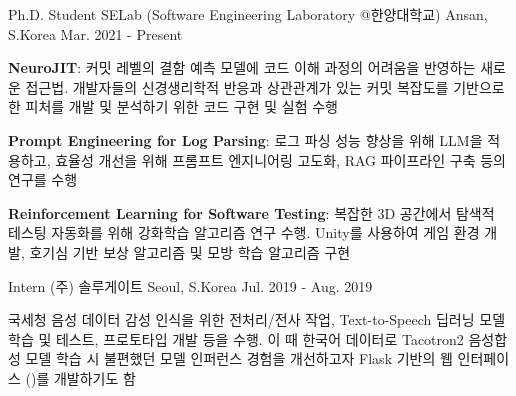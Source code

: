 

\begin{cventries}

  \cventry
    {Ph.D. Student} %
    {SELab (Software Engineering Laboratory @한양대학교)} %
    {Ansan, S.Korea} %
    {Mar. 2021 - Present} %
    {
      \begin{cvitems} %
        \item \textbf{NeuroJIT}: 커밋 레벨의 결함 예측 모델에 코드 이해 과정의 어려움을 반영하는 새로운 접근법. 개발자들의 신경생리학적 반응과 상관관계가 있는 커밋 복잡도를 기반으로 한 피처를 개발 및 분석하기 위한 코드 구현 및 실험 수행
        \item \textbf{Prompt Engineering for Log Parsing}: 로그 파싱 성능 향상을 위해 LLM을 적용하고, 효율성 개선을 위해 프롬프트 엔지니어링 고도화, RAG 파이프라인 구축 등의 연구를 수행
        \item \textbf{Reinforcement Learning for Software Testing}: 복잡한 3D 공간에서 탐색적 테스팅 자동화를 위해 강화학습 알고리즘 연구 수행. Unity를 사용하여 게임 환경 개발, 호기심 기반 보상 알고리즘 및 모방 학습 알고리즘 구현
      \end{cvitems}
    }


\cventry
{Intern} %
{(주) 솔루게이트} %
{Seoul, S.Korea} %
{Jul. 2019 - Aug. 2019} %
{
  \begin{cvitems} %
    \item {국세청 음성 데이터 감성 인식을 위한 전처리/전사 작업, Text-to-Speech 딥러닝 모델 학습 및 테스트, 프로토타입 개발 등을 수행. 이 때 한국어 데이터로 Tacotron2 음성합성 모델 학습 시 불편했던 모델 인퍼런스 경험을 개선하고자 Flask 기반의 웹 인터페이스 ()를 개발하기도 함}
  \end{cvitems}
}


\end{cventries}


